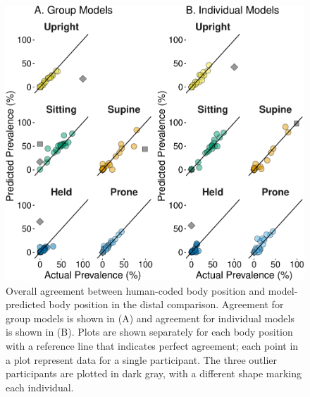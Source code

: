 \documentclass[
  man]{apa6}
\begin{document}
\begin{figure}

{\centering \includegraphics{manuscript_files/figure-latex/part2overall-1} 

}

\caption{Overall agreement between human-coded body position and model-predicted body position in the distal comparison. Agreement for group models is shown in (A) and agreement for individual models is shown in (B). Plots are shown separately for each body position with a reference line that indicates perfect agreement; each point in a plot represent data for a single participant. The three outlier participants are plotted in dark gray, with a different shape marking each individual.}\label{fig:part2overall}
\end{figure}
\end{document}
